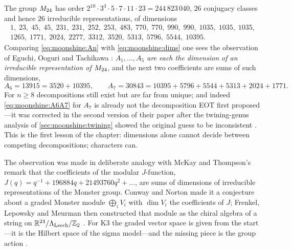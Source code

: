 The group $M_{24}$ has order $2^{10}\cdot3^3\cdot5\cdot7\cdot11\cdot23=244\,823\,040$,
$26$ conjugacy classes and hence $26$ irreducible representations, of dimensions
\begin{equation}\label{eq:moonshine:dims}
\begin{gathered}
 1,\;23,\;45,\;45,\;231,\;231,\;252,\;253,\;483,\;770,\;770,\;990,\;990,\;1035,\;1035,\;1035,\\
 1265,\;1771,\;2024,\;2277,\;3312,\;3520,\;5313,\;5796,\;5544,\;10395.
\end{gathered}
\end{equation}
Comparing \eqref{eq:moonshine:An} with \eqref{eq:moonshine:dims} one sees the observation
of Eguchi, Ooguri and Tachikawa : \emph{$A_1,\dots,A_5$ are
each the dimension of an irreducible representation of $M_{24}$}, and the next two
coefficients are sums of such dimensions,
\begin{equation}\label{eq:moonshine:A6A7}
  A_6=13915=3520+10395,\qquad
  A_7=30843=10395+5796+5544+5313+2024+1771 .
\end{equation}
For $n\ge8$ decompositions still exist but are far from unique; and indeed
\eqref{eq:moonshine:A6A7} for $A_7$ is already not the decomposition EOT first proposed---it
was corrected in the second version of their paper after the twining-genus analysis of
\cref{sec:moonshine:twining} showed the original guess to be inconsistent
. This is the first lesson of the chapter: dimensions
alone cannot decide between competing decompositions; characters can.

\begin{historybox}
The observation was made in deliberate analogy with McKay and Thompson's remark that the
coefficients of the modular $J$-function, $J(q)=q^{-1}+196884q+21493760q^2+\dots$, are
sums of dimensions of irreducible representations of the Monster group. Conway and Norton
made it a conjecture about a graded Monster module $\bigoplus_iV_i$ with $\dim V_i$ the
coefficients of $J$; Frenkel, Lepowsky and Meurman then constructed that module as the
chiral algebra of a string on $\mathbb{R}^{24}/\Lambda_{\mathrm{Leech}}/\mathbb{Z}_2$
. For K3 the graded vector space is given from the start---it
is the Hilbert space of the sigma model---and the missing piece is the group action
.
\end{historybox}

